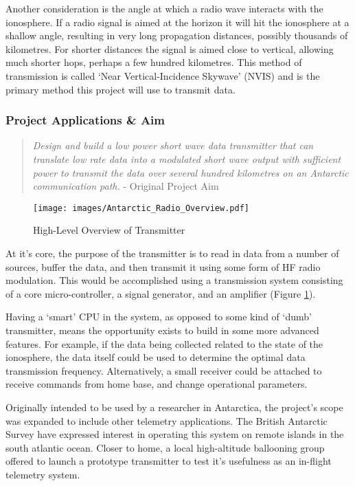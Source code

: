 \documentclass[a4paper,12pt]{article}
\begin{document}
Another consideration is the angle at which a radio wave interacts with the ionosphere. If a radio signal is aimed at the horizon it will hit the ionosphere at a shallow angle, resulting in very long propagation distances, possibly thousands of kilometres. For shorter distances the signal is aimed close to vertical, allowing much shorter hops, perhaps a few hundred kilometres. This method of transmission is called `Near Vertical-Incidence Skywave' (NVIS) and is the primary method this project will use to transmit data.

\subsubsection*{Project Applications \& Aim}

\begin{quote}
\textit{
Design and build a low power short wave data transmitter that can translate low rate data into a modulated short wave output with sufficient power to transmit the data over several hundred kilometres on an Antarctic communication path.}
- Original Project Aim
\end{quote}

\begin{figure}[h]
  \begin{center}
    \texttt{[image: images/Antarctic\_Radio\_Overview.pdf]}
  \end{center}
  \caption{High-Level Overview of Transmitter}
  \label{fig:high_level}
\end{figure}

At it's core, the purpose of the transmitter is to read in data from a number of sources, buffer the data, and then transmit it using some form of HF radio modulation. This would be accomplished using a transmission system consisting of a core micro-controller, a signal generator, and an amplifier (Figure \ref{fig:high_level}).

Having a `smart' CPU in the system, as opposed to some kind of `dumb' transmitter, means the opportunity exists to build in some more advanced features. For example, if the data being collected related to the state of the ionosphere, the data itself could be used to determine the optimal data transmission frequency. Alternatively, a small receiver could be attached to receive commands from home base, and change operational parameters.


Originally intended to be used by a researcher in Antarctica, the project's scope was expanded to include other telemetry applications. The British Antarctic Survey have expressed interest in operating this system on remote islands in the south atlantic ocean. Closer to home, a local high-altitude ballooning group offered to launch a prototype transmitter to test it's usefulness as an in-flight telemetry system.
\end{document}

